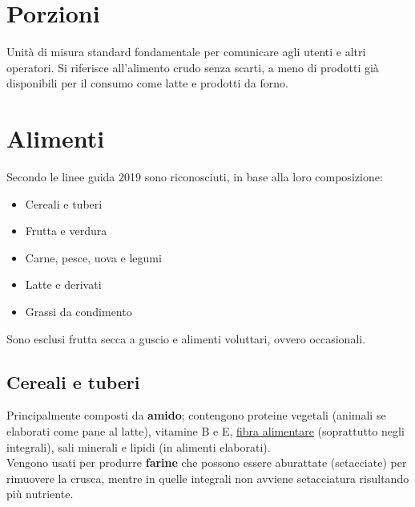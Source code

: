 \documentclass[10pt]{article}
\begin{document}
\section{Porzioni}
Unità di misura standard fondamentale per comunicare agli utenti e altri operatori. Si riferisce all'alimento crudo senza scarti, a meno di prodotti già disponibili per il consumo come latte e prodotti da forno.\\
\section{Alimenti}
Secondo le linee guida 2019 sono riconosciuti, in base alla loro composizione:
\begin{itemize}
\item Cereali e tuberi
\item Frutta e verdura
\item Carne, pesce, uova e legumi
\item Latte e derivati
\item Grassi da condimento 
\end{itemize}
Sono esclusi frutta secca a guscio e alimenti voluttari, ovvero occasionali.
\subsection{Cereali e tuberi}
Principalmente composti da \textbf{amido}; contengono proteine vegetali (animali se elaborati come pane al latte), vitamine B e E, \underline{fibra alimentare} (soprattutto negli integrali), sali minerali e lipidi (in alimenti elaborati).\\
Vengono usati per produrre \textbf{farine} che possono essere aburattate (setacciate) per rimuovere la crusca, mentre in quelle integrali non avviene setacciatura risultando più nutriente. 
\end{document}
